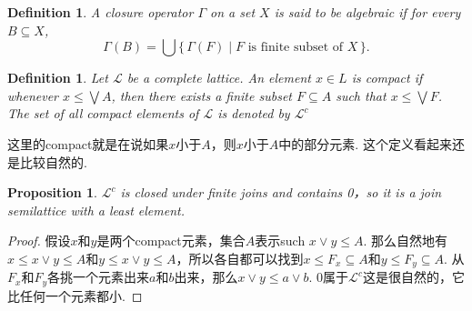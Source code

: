 \documentclass{article}
\newtheorem{proposition}[theorem]{Proposition}
\newtheorem{definition}[theorem]{Definition}
\newcommand\Set[2]{\{\,#1\mid#2\,\}} %
\newcommand\SET[2]{\Set{#1}{\text{#2}}} %
\newcommand\lattice{\mathcal{L}}
\begin{document}
\begin{center}
\end{center}

\begin{definition}
\rm A {\color{red} closure operator} $\Gamma$ on a set $X$ is said to be {\color{red} algebraic} if for every $B \subseteq X$,
$$
\Gamma(B) = \bigcup \SET{\Gamma(F)}{$F$ is finite subset of $X$}.
$$
\end{definition}

\begin{definition}
\rm Let $\lattice$ be a complete lattice. An element $x \in L$ is {\color{red} compact} if whenever $x \leq \bigvee A$, then there exists a finite subset $F \subseteq A$ such that $x \leq \bigvee F$. The set of all compact elements of $\lattice$ is denoted by $\lattice^c$
\end{definition}

{\color{blue} 这里的compact就是在说如果$x$小于$A$，则$x$小于$A$中的部分元素. 这个定义看起来还是比较自然的}.

\begin{proposition}
\rm $\lattice^c$ is closed under finite joins and contains 0，so it is a join semilattice with a least element.
\end{proposition}

\begin{proof}
假设$x$和$y$是两个compact元素，集合$A$表示such $x \vee y \leq A$. 那么自然地有$x \leq x \vee y \leq A $和$y \leq x \vee y \leq A$，所以各自都可以找到$x \leq F_x \subseteq A$和$y \leq F_y \subseteq A$. 从$F_x$和$F_y$各挑一个元素出来$a$和$b$出来，那么$x\vee y \leq a\vee b$. 0属于$\lattice^c$这是很自然的，它比任何一个元素都小.
\end{proof}
\end{document}
